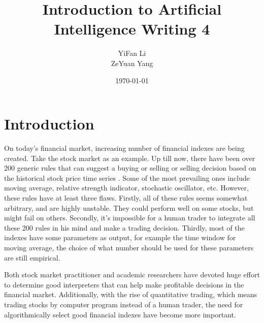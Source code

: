 \documentclass{article}
\title{Introduction to Artificial Intelligence Writing 4}
\author{YiFan Li\\ZeYuan Yang}
\date{\today}
\begin{document}
\maketitle
{}


\section{Introduction}

On today's financial market, increasing number of financial indexes are being created.
Take the stock market as an example.
Up till now, there have been over 200 generic rules
that can suggest a buying or selling or selling decision
based on the historical stock price time series \cite{stock-timing-using-genetic-algorithms}.
Some of the most prevailing ones include moving average, relative strength indicator, stochastic oscillator, etc.
However, these rules have at least three flaws.
Firstly, all of these rules seems somewhat arbitrary, and are highly unstable.
They could perform well on some stocks, but might fail on others.
Secondly, it's impossible for a human trader to integrate all these 200 rules in his mind
and make a trading decision.
Thirdly, most of the indexes have some parameters as output, for example the time window for moving average,
the choice of what number should be used for these parameters are still empirical.

Both stock market practitioner and academic researchers have devoted huge effort to determine good interpreters
that can help make profitable decisions in the financial market.
Additionally, with the rise of quantitative trading,
which means trading stocks by computer program instead of a human trader,
the need for algorithmically select good financial indexes have become more important.
\end{document}
